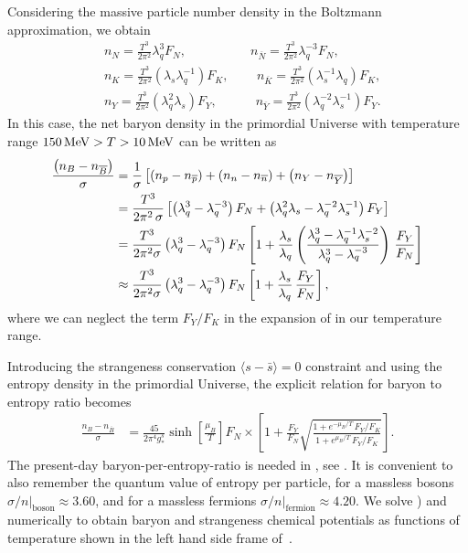 Considering the massive particle number density in the Boltzmann approximation, we obtain
\begin{align}
\label{Density_N}
&n_N=\frac{T^3}{2\pi^2}\lambda_q^3F_N,\quad\qquad\qquad n_{\overline N}=\frac{T^3}{2\pi^2}\lambda^{-3}_qF_N,\\
\label{Density_K}
&n_K=\frac{T^3}{2\pi^2}\left(\lambda_s\lambda_q^{-1}\right)F_K,\,\qquad n_{\overline{K}}=\frac{T^3}{2\pi^2}\left(\lambda_s^{-1}\lambda_q\right)F_K,\\
\label{Density_Y}
&n_Y=\frac{T^3}{2\pi^2}\left(\lambda_q^2\lambda_s\right)F_Y,\quad\qquad n_{\overline Y}=\frac{T^3}{2\pi^2}\left(\lambda^{-2}_q\lambda_s^{-1}\right)F_Y.
\end{align}
In this case, the net baryon density in the primordial Universe with temperature range $150\text{\,MeV}> T>10\text{\,MeV}$ can be written as 
\begin{align}
\frac{\left(n_B-n_{\overline{B}}\right)}{\sigma}&=\frac{1}{\sigma}\left[\left(n_p-n_{\overline{p}}\right)+\left(n_n-n_{\overline{n}}\right)+\left(n_Y-n_{\overline{Y}}\right)\right]\notag\\
&=\frac{T^3}{2\pi^2\,\sigma}\left[\left(\lambda_q^3-\lambda^{-3}_q\right)F_N+\left(\lambda_q^2\lambda_s-\lambda^{-2}_q\lambda_s^{-1}\right)F_Y\right]\notag\\
&=\frac{T^3}{2\pi^2\sigma}\left(\lambda_q^3-\lambda_q^{-3}\right)F_N\left[1+\frac{\lambda_s}{\lambda_q}\left(\frac{\lambda_q^3-\lambda^{-1}_q\lambda_s^{-2}}{\lambda^3_q-\lambda^{-3}_q}\right)\,\frac{F_Y}{F_N}\right]\notag\\
&\approx\frac{T^3}{2\pi^2\sigma}\left(\lambda_q^3-\lambda_q^{-3}\right)F_N\left[1+\frac{\lambda_s}{\lambda_q}\,\frac{F_Y}{F_N}\right],
\end{align}
where we can neglect the term $F_Y/F_K$ in the expansion of  in our temperature range. 

Introducing the strangeness conservation $\langle s-\bar s\rangle=0$ constraint and using the entropy density in the primordial Universe, the explicit relation for baryon to entropy ratio becomes
\begin{align}\label{muBeq}
\frac{n_B-n_{\overline{B}}}{\sigma}&=\frac{45}{2\pi^4g^s_\ast}\sinh\left[\frac{\mu_B}{T}\right]F_N\times\left[1+\frac{F_Y}{F_N}\sqrt{\frac{1+e^{-\mu_B/T}\,F_Y/F_K}{1+e^{\mu_B/T}\,F_Y/F_K}}\right].
\end{align}
The present-day baryon-per-entropy-ratio is needed in , see . It is convenient to also remember the quantum value of entropy per particle, for a massless bosons $\sigma/n|_\mathrm{boson}\approx 3.60$, and for a massless fermions $\sigma/n|_\mathrm{fermion}\approx 4.20$. We solve ) and  numerically to obtain baryon and strangeness chemical potentials as functions of temperature shown in the left hand side frame of~.

